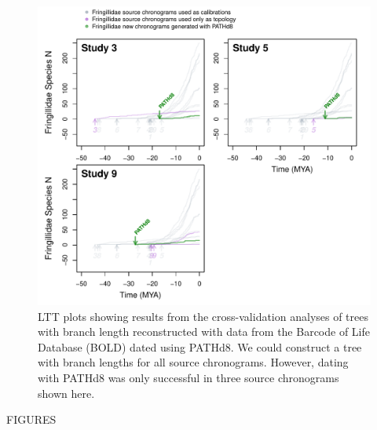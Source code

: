 \documentclass[
  english,
  man]{apa6}
\begin{document}
\begin{figure}[!h]
\includegraphics{../figures/fig_crossval_boldsumm.pdf}
\caption{LTT plots showing results from the cross-validation analyses of trees with branch length reconstructed with data from the Barcode of Life Database (BOLD) dated using PATHd8. We could construct a tree with branch lengths for all source chronograms. However, dating with PATHd8 was only successful in three source chronograms shown here.}
\label{fig:cvbold}
\end{figure}
FIGURES

\end{document}
